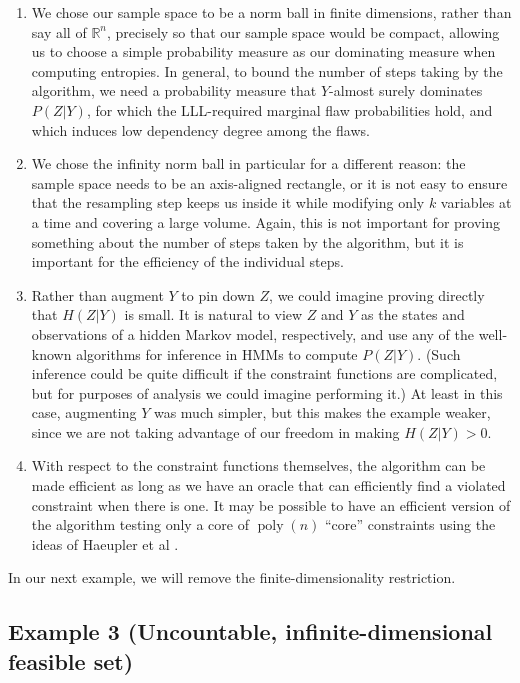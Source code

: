 \documentclass[twocolumn]{article}
\newcommand{\Reals}%
  {\mathbb{R}}
\begin{document}
\begin{enumerate}
  \item We chose our sample space to be a norm ball in finite dimensions, rather than say all of $\Reals^n$, precisely so that our sample space would be compact, allowing us to choose a simple probability measure as our dominating measure when computing entropies.  In general, to bound the number of steps taking by the algorithm, we need a probability measure that $Y$-almost surely dominates $P(Z | Y)$, for which the LLL-required marginal flaw probabilities hold, and which induces low dependency degree among the flaws.
  \item We chose the infinity norm ball in particular for a different reason: the sample space needs to be an axis-aligned rectangle, or it is not easy to ensure that the resampling step keeps us inside it while modifying only $k$ variables at a time and covering a large volume.  Again, this is not important for proving something about the number of steps taken by the algorithm, but it is important for the efficiency of the individual steps.
  \item Rather than augment $Y$ to pin down $Z$, we could imagine proving directly that $H(Z | Y)$ is small.  It is natural to view $Z$ and $Y$ as the states and observations of a hidden Markov model, respectively, and use any of the well-known algorithms for inference in HMMs to compute $P(Z | Y)$.  (Such inference could be quite difficult if the constraint functions are complicated, but for purposes of analysis we could imagine performing it.)  At least in this case, augmenting $Y$ was much simpler, but this makes the example weaker, since we are not taking advantage of our freedom in making $H(Z | Y) > 0$.
  \item With respect to the constraint functions themselves, the algorithm can be made efficient as long as we have an oracle that can efficiently find a violated constraint when there is one.  It may be possible to have an efficient version of the algorithm testing only a core of $\operatorname{poly}(n)$ ``core'' constraints using the ideas of Haeupler et al \cite{haeupler2011new}.
\end{enumerate}

In our next example, we will remove the finite-dimensionality restriction.

\subsection{Example 3 (Uncountable, infinite-dimensional feasible set)}
\end{document}
